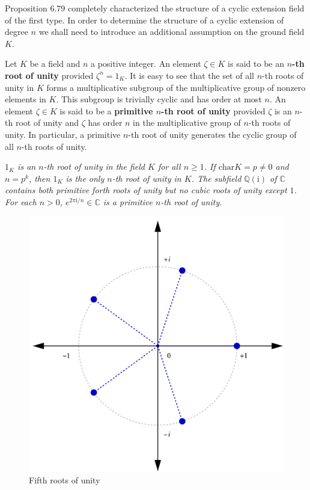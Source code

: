 Proposition 6.79 completely characterized the structure of a cyclic extension field of the first type. In order to determine the structure of a cyclic extension of degree $n$ we shall need to introduce an additional assumption on the ground field $K$.\par
Let $K$ be a field and $n$ a positive integer. An element $\zeta\in K$ is said to be an \textbf{$n$-th root of unity} provided $\zeta^n=1_K$. It is easy to see that the set of all $n$-th roots of unity in $K$ forms a multiplicative subgroup of the multiplicative group of nonzero elements in $K$. This subgroup is trivially cyclic and has order at most $n$. An element $\zeta\in K$ is said to be a \textbf{primitive $n$-th root of unity} provided $\zeta$ is an $n$-th root of unity and $\zeta$ has order $n$ in the multiplicative group of $n$-th roots of unity. In particular, a primitive $n$-th root of unity generates the cyclic group of all $n$-th roots of unity.
\begin{example}\em
$1_K$ is an $n$-th root of unity in the field $K$ for all $n\ge 1$. If $\mathrm{char}K=p\ne 0$ and $n=p^k$, then $1_K$ is the only $n$-th root of unity in $K$. The subfield $\mathbb{Q}(\mathrm{i})$ of $\mathbb{C}$ contains both primitive forth roots of unity but no cubic roots of unity except $1$. For each $n>0$, $e^{2\pi\mathrm{i}/n}\in\mathbb{C}$ is a primitive $n$-th root of unity.
\begin{figure}[htbp]
    \center
    \includegraphics[scale=0.19]{Images/1200px-One5Root.svg.png}
    \caption{Fifth roots of unity}
\end{figure}
\end{example}